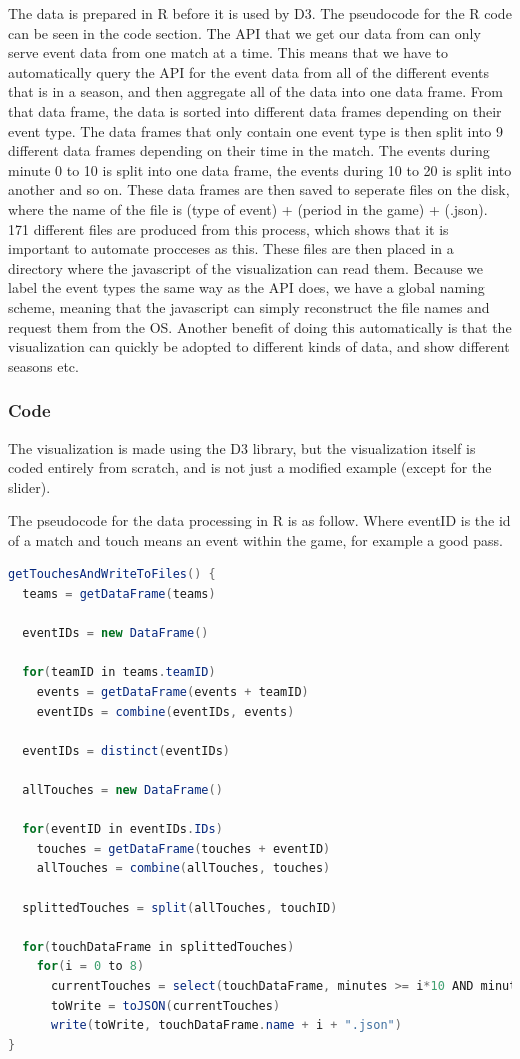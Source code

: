 \documentclass[Report.tex]{subfiles}
\begin{document}
The data is prepared in R before it is used by D3. The pseudocode for the R code can be seen in the code section. The API that we get our data from can only serve event data from one match at a time. This means that we have to automatically query the API for the event data from all of the different events that is in a season, and then aggregate all of the data into one data frame. From that data frame, the data is sorted into different data frames depending on their event type. The data frames that only contain one event type is then split into 9 different data frames depending on their time in the match. The events during minute 0 to 10 is split into one data frame, the events during 10 to 20 is split into another and so on. These data frames are then saved to seperate files on the disk, where the name of the file is (type of event) + (period in the game) + (.json). 171 different files are produced from this process, which shows that it is important to automate procceses as this. These files are then placed in a directory where the javascript of the visualization can read them. Because we label the event types the same way as the API does, we have a global naming scheme, meaning that the javascript can simply reconstruct the file names and request them from the OS. Another benefit of doing this automatically is that the visualization can quickly be adopted to different kinds of data, and show different seasons etc.

\subsubsection{Code}
The visualization is made using the D3 library, but the visualization itself is coded entirely from scratch, and is not just a modified example (except for the slider).

The pseudocode for the data processing in R is as follow.
Where eventID is the id of a match and touch means an event within the game, for example a good pass.

\begin{lstlisting}[language=java]
getTouchesAndWriteToFiles() {
  teams = getDataFrame(teams)

  eventIDs = new DataFrame()

  for(teamID in teams.teamID)
    events = getDataFrame(events + teamID)
    eventIDs = combine(eventIDs, events)

  eventIDs = distinct(eventIDs)

  allTouches = new DataFrame()

  for(eventID in eventIDs.IDs)
    touches = getDataFrame(touches + eventID)
    allTouches = combine(allTouches, touches)

  splittedTouches = split(allTouches, touchID)

  for(touchDataFrame in splittedTouches)
    for(i = 0 to 8)
      currentTouches = select(touchDataFrame, minutes >= i*10 AND minutes < (i + 1)*10)
      toWrite = toJSON(currentTouches)
      write(toWrite, touchDataFrame.name + i + ".json")
}
\end{lstlisting}
\end{document}

